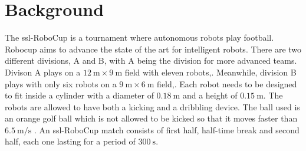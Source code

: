 \section{Background}
\label{section:background}

The \ac{ssl}-RoboCup is a tournament where autonomous robots play football\:\cite{da_silva_costa_multi-robot_2024}. Robocup aims to advance the state of the art for intelligent robots\:\cite{noauthor_small_nodate}. There are two different divisions, A and B, with A being the division for more advanced teams\:\cite{noauthor_rules_2024}. Divison A plays on a $12\:\text{m} \times 9\:\text{m}$ field with eleven robots\:\cite{da_silva_costa_multi-robot_2024},\cite{noauthor_rules_2024}. Meanwhile, division B plays with only six robots on a $9\:\text{m} \times 6\:\text{m}$ field\:\cite{da_silva_costa_multi-robot_2024},\cite{noauthor_rules_2024}. 
Each robot needs to be designed to fit inside a cylinder with a diameter of $0.18\:\text{m}$ and a height of $0.15\:\text{m}$\:\cite{noauthor_rules_2024}. The robots are allowed to have both a kicking and a dribbling device\:\cite{noauthor_rules_2024}. The ball used is an orange golf ball which is not allowed to be kicked so that it moves faster than $6.5\:\text{m}/\text{s}$ \cite{noauthor_rules_2024}. 
An \ac{ssl}-RoboCup match consists of first half, half-time break and second half, each one lasting for a period of $300\:\text{s}$\:\cite{noauthor_rules_2024}.



